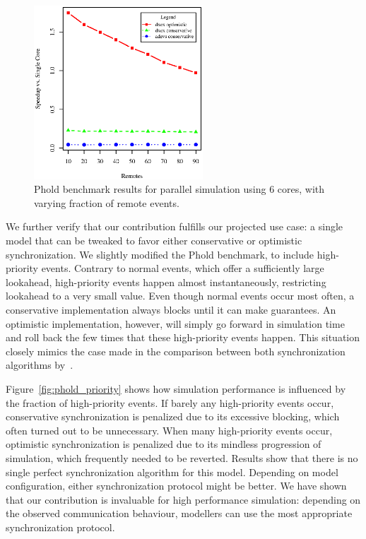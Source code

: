 \begin{figure}
    \includegraphics[width=\columnwidth,height=6.5cm]{fig/phold_remotes.eps}
    \caption{Phold benchmark results for parallel simulation using 6 cores, with varying fraction of remote events.}
\end{figure}

We further verify that our contribution fulfills our projected use case: a single model that can be tweaked to favor either conservative or optimistic synchronization.
We slightly modified the Phold benchmark, to include high-priority events.
Contrary to normal events, which offer a sufficiently large lookahead, high-priority events happen almost instantaneously, restricting lookahead to a very small value.
Even though normal events  occur most often, a conservative implementation always blocks until it can make guarantees.
An optimistic implementation, however, will simply go forward in simulation time and roll back the few times that these high-priority events happen.
This situation closely mimics the case made in the comparison between both synchronization algorithms by~\cite{FujimotoBook}.

Figure~\ref{fig:phold_priority} shows how simulation performance is influenced by the fraction of high-priority events.
If barely any high-priority events occur, conservative synchronization is penalized due to its excessive blocking, which often turned out to be unnecessary.
When many high-priority events occur, optimistic synchronization is penalized due to its mindless progression of simulation, which frequently needed to be reverted.
Results show that there is no single perfect synchronization algorithm for this model.
Depending on model configuration, either synchronization protocol might be better.
We have shown that our contribution is invaluable for high performance simulation: depending on the observed communication behaviour, modellers can use the most appropriate synchronization protocol.

